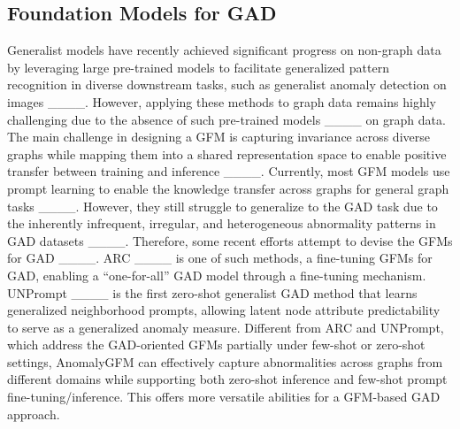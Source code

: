 


\subsection{Foundation Models for GAD}
Generalist models have recently achieved significant progress on non-graph data by leveraging large pre-trained models to facilitate generalized pattern recognition in diverse downstream tasks, such as generalist anomaly detection on images ____. However, applying these methods to graph data remains highly challenging due to the absence of such pre-trained models ____ on graph data.
The main challenge in designing a GFM is capturing invariance across diverse graphs while mapping them into a shared representation space to enable positive transfer between training and inference ____. Currently, most GFM models use prompt learning to enable the knowledge transfer across graphs for general graph tasks ____.
However,
they still struggle to generalize to the GAD task due to the inherently infrequent, irregular, and heterogeneous
abnormality patterns in GAD datasets ____. Therefore, 
some recent efforts attempt to devise the GFMs for GAD ____.
ARC ____ is one of such methods, a fine-tuning GFMs for GAD, enabling a ``one-for-all” GAD model through a fine-tuning mechanism. 
UNPrompt ____ is the first zero-shot generalist GAD method that learns generalized neighborhood prompts, allowing latent node attribute predictability to serve as a generalized anomaly measure.
Different from ARC and UNPrompt, which address the GAD-oriented GFMs partially under few-shot or zero-shot settings, AnomalyGFM can effectively capture abnormalities across graphs from different domains while supporting both zero-shot inference and few-shot prompt fine-tuning/inference. This offers more versatile abilities for a GFM-based GAD approach.
